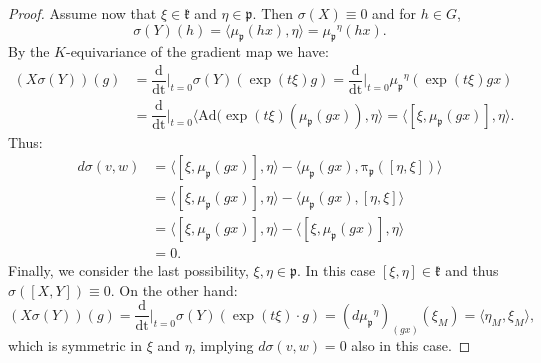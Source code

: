 \documentclass[leqno,11pt, a4]{amsart}
\theoremstyle{named}
\begin{document}
\begin{proof}
Assume now that $\xi  \in {\mathfrak{k}}$ and $\eta \in {\mathfrak{p}}$.  Then
$\sigma(X) \equiv 0$ and for $h\in G$,
\[
\sigma(Y) (h) = \langle {\mu_{\mathfrak{p}}}(h x), \eta {\rangle} ={\mu_{\mathfrak{p}}}^{\eta} (h x).
\]
By the $K$-equivariance of the gradient map we have:
\[
\begin{split}
(X \sigma(Y))(g) &= {{\dfrac {\mathrm {d}  }{\mathrm {dt}}} \vert _{t=0} } \sigma(Y) ( \exp (t\xi ) g) =
  {{\dfrac {\mathrm {d}  }{\mathrm {dt}}} \vert _{t=0} } {\mu_{\mathfrak{p}}}^{\eta}( \exp (t\xi ) g  x)  \\
  &={{\dfrac {\mathrm {d}  }{\mathrm {dt}}} \vert _{t=0} } \langle \mathrm{Ad}(\exp(t \xi) ({\mu_{\mathfrak{p}}}(g x)),\eta \rangle = \langle [\xi , {\mu_{\mathfrak{p}}}(g  x)],\eta \rangle.
 \end{split}
\]
Thus:
\[
\begin{split}
  d\sigma(v,w) &= \langle [\xi , {\mu_{\mathfrak{p}}}(g  x)],\eta \rangle -{\langle} {\mu_{\mathfrak{p}}}(g  x), {\operatorname{\pi_{\mathfrak{p}}}}([\eta,\xi ]){\rangle}
  \\ &=   \langle [\xi , {\mu_{\mathfrak{p}}}(g  x)],\eta \rangle - {\langle} {\mu_{\mathfrak{p}}}(g  x), [\eta,\xi ] {\rangle} \\
  &=  \langle [\xi , {\mu_{\mathfrak{p}}} (g  x)],\eta \rangle   -{\langle} [ \xi , {\mu_{\mathfrak{p}}} (g  x) ] , \eta {\rangle}\\ & = 0.
\end{split}
\]
Finally, we consider the last possibility, $\xi, \eta \in {\mathfrak{p}}$. In this case $[\xi , \eta ] \in {\mathfrak{k}}$ and thus $\sigma([X,Y]) \equiv 0$.
On the other hand:
\[
  (X\sigma(Y))(g) = {{\dfrac {\mathrm {d}  }{\mathrm {dt}}} \vert _{t=0} } \sigma(Y) ( \exp (t\xi )\cdot  g) =
   ( d{\mu_{\mathfrak{p}}}^{\eta} )_{(g x)}(  \xi_M) = \langle \eta_M , \xi_M \rangle,
\]
which is symmetric in $\xi$ and $\eta$, implying $d\sigma (v, w) =0$ also in this case.


\end{proof}
\end{document}

